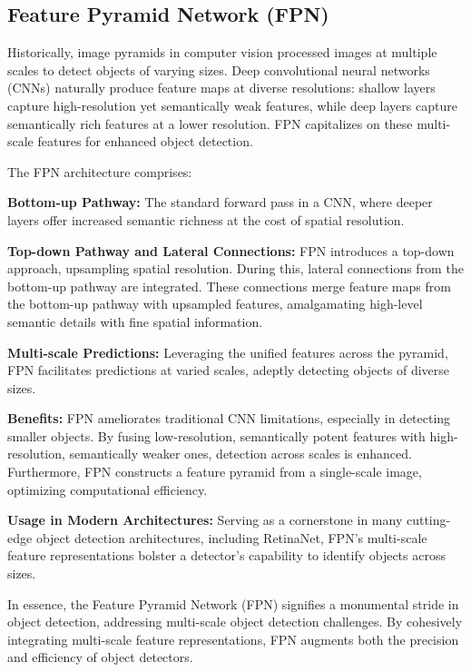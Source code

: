 \documentclass{article}
\begin{document}
\subsection{Feature Pyramid Network (FPN)}

Historically, image pyramids in computer vision processed images at multiple scales to detect objects of varying sizes. Deep convolutional neural networks (CNNs) naturally produce feature maps at diverse resolutions: shallow layers capture high-resolution yet semantically weak features, while deep layers capture semantically rich features at a lower resolution. FPN \cite{lin2017feature} capitalizes on these multi-scale features for enhanced object detection.

The FPN architecture comprises:

\textbf{Bottom-up Pathway:} The standard forward pass in a CNN, where deeper layers offer increased semantic richness at the cost of spatial resolution.

\textbf{Top-down Pathway and Lateral Connections:} FPN introduces a top-down approach, upsampling spatial resolution. During this, lateral connections from the bottom-up pathway are integrated. These connections merge feature maps from the bottom-up pathway with upsampled features, amalgamating high-level semantic details with fine spatial information.

\textbf{Multi-scale Predictions:} Leveraging the unified features across the pyramid, FPN facilitates predictions at varied scales, adeptly detecting objects of diverse sizes.

\textbf{Benefits:} FPN ameliorates traditional CNN limitations, especially in detecting smaller objects. By fusing low-resolution, semantically potent features with high-resolution, semantically weaker ones, detection across scales is enhanced. Furthermore, FPN constructs a feature pyramid from a single-scale image, optimizing computational efficiency.

\textbf{Usage in Modern Architectures:} Serving as a cornerstone in many cutting-edge object detection architectures, including RetinaNet, FPN's multi-scale feature representations bolster a detector's capability to identify objects across sizes.

In essence, the Feature Pyramid Network (FPN) signifies a monumental stride in object detection, addressing multi-scale object detection challenges. By cohesively integrating multi-scale feature representations, FPN augments both the precision and efficiency of object detectors.
\end{document}
